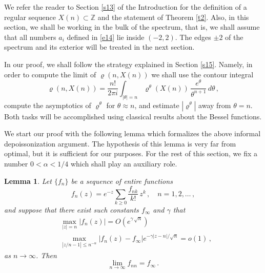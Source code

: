 \documentclass[12pt]{amsart}
\newcommand{\al}{\alpha}
\newcommand{\brh}{\boldsymbol{\varrho}}
\newcommand{\Z}{\mathbb{Z}}
\newcommand{\g}{\gamma}
\newcommand{\ix}{\theta}
\theoremstyle{plain}
\newtheorem{lemma}{Lemma}[section]
\theoremstyle{definition}
\numberwithin{equation}{section}
\begin{document}
We refer the reader to Section \ref{s13} of the Introduction for
the definition of a regular sequence $X(n)\subset\Z$ and the
statement of Theorem \ref{t2}. Also, in this section, we shall be working in the bulk of the spectrum,
that is, we shall assume that all numbers $a_i$ defined in \eqref{e14}
lie inside $(-2,2)$. The edges $\pm2$ of the spectrum and its exterior will be treated  in
the next section. 
 
In our proof, we shall follow the strategy explained in Section \ref{s15}.
Namely, in order to compute the limit of $\brh(n,X(n))$ we shall
use the contour integral
%
\begin{equation*}
\brh(n,X(n)) = \frac{n!}{2\pi i} \int_{|\ix|=n}  \brh^\ix(X(n))\, 
\frac{e^\ix}{\ix^{n+1}} \,  d\ix \,, 
\end{equation*}
%
compute the asymptotics of $\brh^\ix$ for $\ix\approx n$, and
estimate $|\brh^\ix|$ away from $\ix=n$.  Both tasks will be 
accomplished using classical results about the Bessel functions. 

We start our proof  with the following
lemma which  formalizes the above  informal depoissonization
argument.  The hypothesis of this lemma
is very far from optimal, but it is sufficient for our purposes.
For the rest of this section, we fix a number $0<\al<1/4$ which
shall play an auxiliary role.   

\begin{lemma}\label{l31} Let $\{f_n\}$ be a sequence of entire functions
%
\begin{equation*}
f_n(z)=e^{-z} \sum_{k\ge 0} \frac{f_{nk}}{k!} \, z^k \,,
\quad n =1,2,\dots \,, 
\end{equation*}
%
and suppose that there exist  such constants  $f_\infty$ and $\g$ that
%
\begin{align} 
&\max_{|z|= n} \left|f_n(z)\right|  
= O\left(e^{\g\,\sqrt{n}}\right)  \label{A}
\\
&
\max_{|z/n-1|\le n^{-\al}} 
\left|f_n(z)-f_\infty\right| e^{-\g|z-n|/\sqrt{n}} = o(1) \label{B}\,,
\end{align} 
%
as $n\to\infty$.  Then 
%
\begin{equation*}
\lim_{n\to\infty} f_{nn} =  f_\infty\,.
\end{equation*}
%
\end{lemma}
\end{document}
